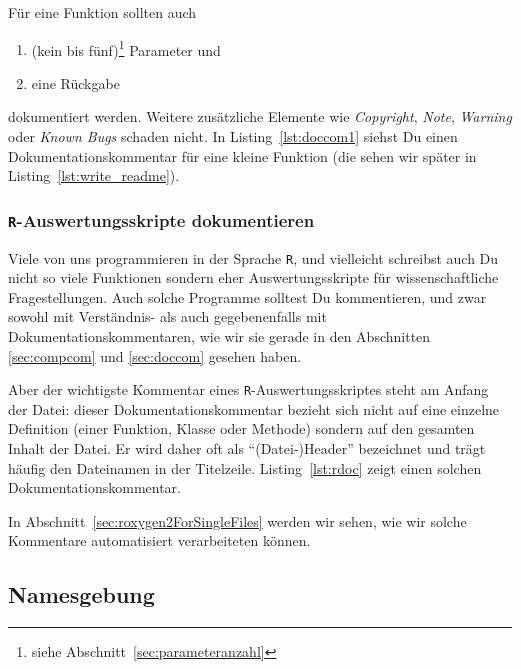 \documentclass[twoside]{scrartcl}
\providecommand{\R}{\texttt{R}}
\begin{document}
F\"u{}r eine Funktion sollten auch 
\begin{enumerate}[resume]
    \item (kein bis f\"u{}nf)\footnote{siehe
	    Abschnitt~\ref{sec:parameteranzahl}} Parameter und 
    \item eine R\"u{}ckgabe
\end{enumerate}
dokumentiert werden. Weitere zus\"a{}tzliche Elemente wie \emph{Copyright},
\emph{Note}, \emph{Warning} oder \emph{Known Bugs} schaden nicht.
In Listing~\ref{lst:doccom1} siehst Du einen Dokumentationskommentar
f\"u{}r eine kleine Funktion (die sehen wir sp\"a{}ter in
Listing~\ref{lst:write_readme}).


\subsubsection{\R{}-Auswertungsskripte dokumentieren
\label{sec:rdoc}
}
Viele von uns programmieren in der Sprache \R{}, und vielleicht schreibst 
auch Du nicht so viele Funktionen sondern eher Auswertungsskripte f\"u{}r 
wissenschaftliche Fragestellungen. 
Auch solche Programme solltest Du kommentieren, und zwar sowohl mit 
Verst\"a{}ndnis- als auch gegebenenfalls mit  Dokumentationskommentaren, wie wir
sie gerade in den Abschnitten \ref{sec:compcom} und \ref{sec:doccom} gesehen 
haben.

Aber der wichtigste Kommentar eines \R{}-Auswertungsskriptes steht  
am Anfang der Datei: dieser Dokumentationskommentar bezieht sich nicht auf eine
einzelne Definition (einer Funktion, Klasse oder Methode) sondern auf den 
gesamten Inhalt der
Datei. Er wird daher oft als "`(Datei-)Header"' bezeichnet und tr\"a{}gt
h\"a{}ufig den Dateinamen in der Titelzeile.
Listing~\ref{lst:rdoc} zeigt einen solchen Dokumentationskommentar. 

 
In Abschnitt~\ref{sec:roxygen2ForSingleFiles} werden wir sehen, wie wir solche
Kommentare automatisiert verarbeiteten k\"o{}nnen.


\subsection{Namesgebung\label{sec:naming}}
\end{document}
